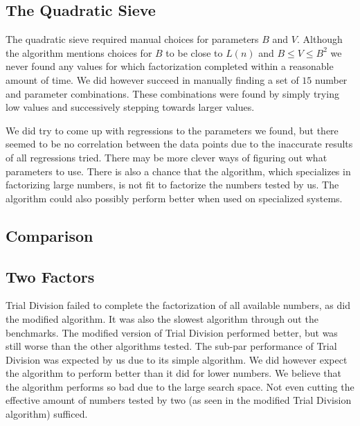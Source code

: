 \subsection{The Quadratic Sieve}

The quadratic sieve required manual choices for parameters $B$ and $V$. Although the algorithm mentions choices for $B$ to be close to $L(n)$ and $B\leq V \leq B^2$ we never found any values for which factorization completed within a reasonable amount of time. We did however succeed in manually finding a set of $15$ number and parameter combinations. These combinations were found by simply trying low values and successively stepping towards larger values.

We did try to come up with regressions to the parameters we found, but there seemed to be no correlation between the data points due to the inaccurate results of all regressions tried. There may be more clever ways of figuring out what parameters to use. There is also a chance that the algorithm, which specializes in factorizing large numbers, is not fit to factorize the numbers tested by us. The algorithm could also possibly perform better when used on specialized systems. 

\subsection{Comparison}

\subsection{Two Factors}

Trial Division failed to complete the factorization of all available numbers, as did the modified algorithm. It was also the slowest algorithm through out the benchmarks. The modified version of Trial Division performed better, but was still worse than the other algorithms tested. The sub-par performance of Trial Division was expected by us due to its simple algorithm. We did however expect the algorithm to perform better than it did for lower numbers. We believe that the algorithm performs so bad due to the large search space. Not even cutting the effective amount of numbers tested by two (as seen in the modified Trial Division algorithm) sufficed.

